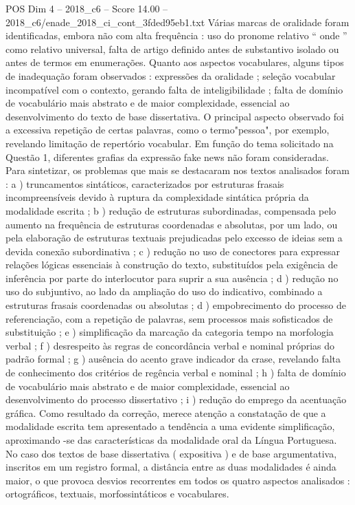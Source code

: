 \begin{textsample}{POS Dim 4 – 2018\_c6 – Score 14.00 – 2018\_c6/enade\_2018\_ci\_cont\_3fded95eb1.txt}
Várias marcas de oralidade foram identificadas, embora não com alta frequência : uso do pronome relativo “ onde ” como relativo universal, falta de artigo definido antes de substantivo isolado ou antes de termos em enumerações.
Quanto aos aspectos vocabulares, alguns tipos de inadequação foram observados : expressões da oralidade ; seleção vocabular incompatível com o contexto, gerando falta de inteligibilidade ; falta de domínio de vocabulário mais abstrato e de maior complexidade, essencial ao desenvolvimento do texto de base dissertativa.
O principal aspecto observado foi a excessiva repetição de certas palavras, como o termo"pessoa", por exemplo, revelando limitação de repertório vocabular.
Em função do tema solicitado na Questão 1, diferentes grafias da expressão fake news não foram consideradas.
Para sintetizar, os problemas que mais se destacaram nos textos analisados foram : a ) truncamentos sintáticos, caracterizados por estruturas frasais incompreensíveis devido à ruptura da complexidade sintática própria da modalidade escrita ; b ) redução de estruturas subordinadas, compensada pelo aumento na frequência de estruturas coordenadas e absolutas, por um lado, ou pela elaboração de estruturas textuais prejudicadas pelo excesso de ideias sem a devida conexão subordinativa ; c ) redução no uso de conectores para expressar relações lógicas essenciais à construção do texto, substituídos pela exigência de inferência por parte do interlocutor para suprir a sua ausência ; d ) redução no uso do subjuntivo, ao lado da ampliação do uso do indicativo, combinado a estruturas frasais coordenadas ou absolutas ; d ) empobrecimento do processo de referenciação, com a repetição de palavras, sem processos mais sofisticados de substituição ; e ) simplificação da marcação da categoria tempo na morfologia verbal ; f ) desrespeito às regras de concordância verbal e nominal próprias do padrão formal ; g ) ausência do acento grave indicador da crase, revelando falta de conhecimento dos critérios de regência verbal e nominal ; h ) falta de domínio de vocabulário mais abstrato e de maior complexidade, essencial ao desenvolvimento do processo dissertativo ; i ) redução do emprego da acentuação gráfica.
Como resultado da correção, merece atenção a constatação de que a modalidade escrita tem apresentado a tendência a uma evidente simplificação, aproximando -se das características da modalidade oral da Língua Portuguesa.
No caso dos textos de base dissertativa ( expositiva ) e de base argumentativa, inscritos em um registro formal, a distância entre as duas modalidades é ainda maior, o que provoca desvios recorrentes em todos os quatro aspectos analisados : ortográficos, textuais, morfossintáticos e vocabulares.

\end{textsample}
